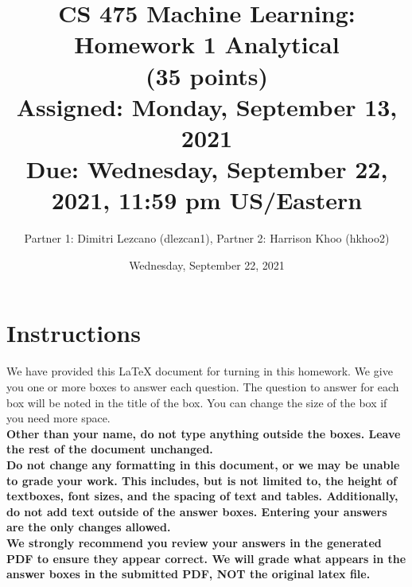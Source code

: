 \documentclass[11pt]{article}
\title{CS 475 Machine Learning: Homework 1 Analytical \\
(35 points)\\
\Large{Assigned: Monday, September 13, 2021} \\
\Large{Due: Wednesday, September 22, 2021, 11:59 pm US/Eastern}}
\author{Partner 1: Dimitri Lezcano (dlezcan1), Partner 2:  Harrison Khoo (hkhoo2)}
\date{Wednesday, September 22, 2021}
\renewcommand{\vec}[1]{\mathbf{#1}}
\begin{document}
\maketitle
\thispagestyle{headings}

\section*{Instructions }
We have provided this \LaTeX{} document for turning in this homework. We give you one or more boxes to answer each question.  The question to answer for each box will be noted in the title of the box.  You can change the size of the box if you need more space.\\

{\bf Other than your name, do not type anything outside the boxes. Leave the rest of the document unchanged.}\\


\textbf{Do not change any formatting in this document, or we may be unable to
  grade your work. This includes, but is not limited to, the height of
  textboxes, font sizes, and the spacing of text and tables.  Additionally, do
  not add text outside of the answer boxes. Entering your answers are the only
  changes allowed.}\\


\textbf{We strongly recommend you review your answers in the generated PDF to
  ensure they appear correct. We will grade what appears in the answer boxes in
  the submitted PDF, NOT the original latex file.}

\end{document}
